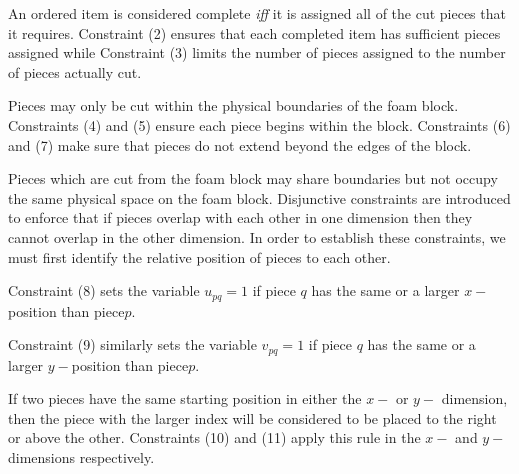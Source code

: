 \documentclass[10pt,a4paper]{article}
\begin{document}

\begin{lpformulation}
\end{lpformulation}


An ordered item is considered complete \textit{iff} it is assigned all of the cut pieces that it requires. Constraint (2) ensures that each completed item has sufficient pieces assigned while Constraint (3) limits the number of pieces assigned to the number of pieces actually cut.

Pieces may only be cut within the physical boundaries of the foam block. Constraints (4) and (5) ensure each piece begins within the block. Constraints (6) and (7) make sure that pieces do not extend beyond the edges of the block.

\begin{lpformulation}
\end{lpformulation}

Pieces which are cut from the foam block may share boundaries but not occupy the same physical space on the foam block. Disjunctive constraints are introduced to enforce that if pieces overlap with each other in one dimension then they cannot overlap in the other dimension. In order to establish these constraints, we must first identify the relative position of pieces to each other.

Constraint (8) sets the variable $u_{pq} = 1$ if piece $q$ has the same or a larger $x-$position than piece$p$.  
\begin{lpformulation}
\end{lpformulation}

Constraint (9) similarly sets the variable $v_{pq} = 1$ if piece $q$ has the same or a larger $y-$position than piece$p$.
\begin{lpformulation}
\end{lpformulation}

If two pieces have the same starting position in either the $x-$ or $y-$ dimension, then the piece with the larger index will be considered to be placed to the right or above the other. Constraints (10) and (11) apply this rule in the $x-$ and $y-$ dimensions respectively.
\begin{lpformulation}
\end{lpformulation}
\begin{lpformulation}
\end{lpformulation}
\end{document}
